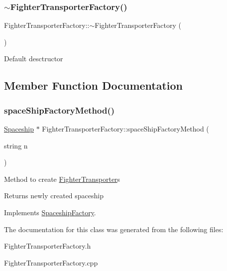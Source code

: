 \subsubsection{\texorpdfstring{$\sim$\+Fighter\+Transporter\+Factory()}{~FighterTransporterFactory()}}
{\footnotesize\ttfamily Fighter\+Transporter\+Factory\+::$\sim$\+Fighter\+Transporter\+Factory (\begin{DoxyParamCaption}{ }\end{DoxyParamCaption})}

Default desctructor 

\subsection{Member Function Documentation}
\mbox{\label{classFighterTransporterFactory_a1f2a5002cb9ea812fee8d224884fbdff}} 
\subsubsection{\texorpdfstring{space\+Ship\+Factory\+Method()}{spaceShipFactoryMethod()}}
{\footnotesize\ttfamily \hyperlink{classSpaceship}{Spaceship} $\ast$ Fighter\+Transporter\+Factory\+::space\+Ship\+Factory\+Method (\begin{DoxyParamCaption}\item[{string}]{n }\end{DoxyParamCaption})\hspace{0.3cm}{\ttfamily [virtual]}}

Method to create \hyperlink{classFighterTransporter}{Fighter\+Transporter}\textquotesingle{}s \begin{DoxyReturn}{Returns}
newly created spaceship 
\end{DoxyReturn}


Implements \hyperlink{classSpaceshipFactory_a70b50dd616cb16f50088eff9ca07cda9}{Spaceship\+Factory}.



The documentation for this class was generated from the following files\+:\begin{DoxyCompactItemize}
\item 
Fighter\+Transporter\+Factory.\+h\item 
Fighter\+Transporter\+Factory.\+cpp\end{DoxyCompactItemize}
